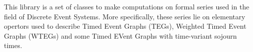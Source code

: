 This library is a set of classes to make computations on formal series used in the field of Discrete Event Systems. More specifically, these series lie on elementary opertors used to describe Timed Event Graphs (T\+E\+Gs), Weighted Timed Event Graphs (W\+T\+E\+Gs) and some Timed E\+Vent Graphs with time-\/variant sojourn times. 